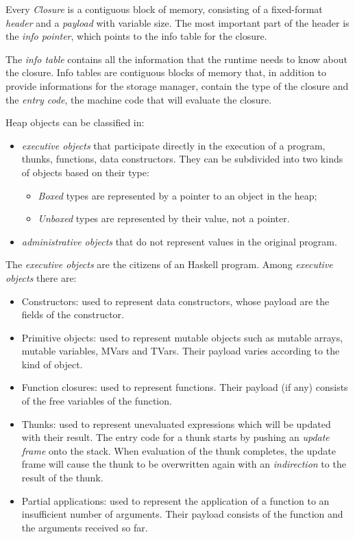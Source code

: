 Every \emph{Closure} is a contiguous block of memory, consisting of a fixed-format \emph{header} and a \emph{payload} with variable size.
The most important part of the header is the \emph{info pointer},  which points to the info table for the closure.

The \emph{info table} contains all the information that the runtime needs to know about the closure.
Info tables are contiguous blocks of memory that, in addition to provide informations for the storage manager, contain the type of the closure and the \emph{entry code}, \ie the machine code that will evaluate the closure.

Heap objects can be classified in:
\begin{itemize}
\item \emph{executive objects} that participate directly in the execution of a program, \eg thunks, functions, data constructors. They can be subdivided into two kinds of objects based on their type:
\begin{itemize}
\item \emph{Boxed} types are represented by a pointer to an object in the heap;
\item \emph{Unboxed} types are represented by their value, not a pointer.
\end{itemize}
\item \emph{administrative objects} that do not represent values in the original program.
\end{itemize}

The \emph{executive objects} are the citizens of an Haskell program. Among \emph{executive objects} there are:
\begin{itemize}
\item Constructors: used to represent data constructors, whose payload are the fields of the constructor.
\item Primitive objects: used to represent mutable objects such as mutable arrays, mutable variables, MVars and TVars. Their payload varies according to the kind of object.
\item Function closures: used to represent functions. Their payload (if any) consists of the free variables of the function.
\item Thunks: used to represent unevaluated expressions which will be updated with their result. The entry code for a thunk starts by pushing an \emph{update frame} onto the stack. When evaluation of the thunk completes, the update frame will cause the thunk to be overwritten again with an \emph{indirection} to the result of the thunk.
\item Partial applications: used to represent the application of a function to an insufficient number of arguments. Their payload consists of the function and the arguments received so far.
\end{itemize}

